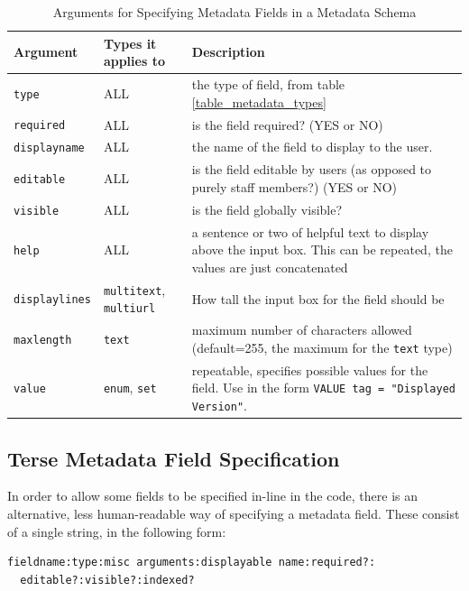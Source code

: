 \begin{table}
\begin{tabularx}{350pt}{|l|l|X|}
\hline
Argument           & Types it applies to   & Description \\
\hline
{\tt type}         & ALL                   & the type of field, from table \ref{table_metadata_types} \\
{\tt required}     & ALL                   & is the field required? (YES or NO) \\
{\tt displayname}  & ALL                   & the name of the field to display to the user. \\
{\tt editable}     & ALL                   & is the field editable by users (as opposed to purely staff members?) (YES or NO) \\
{\tt visible}      & ALL                   & is the field globally visible? \\
{\tt help}         & ALL                   & a sentence or two of helpful text to display above the input box. This can be repeated, the values are just concatenated \\
{\tt displaylines} & {\tt multitext}, {\tt multiurl} & How tall the input box for the field should be \\
{\tt maxlength}    & {\tt text}            & maximum number of characters allowed (default=255, the maximum for the {\tt text} type) \\
{\tt value}        & {\tt enum}, {\tt set} & repeatable, specifies possible values for the field. Use in the form {\tt VALUE tag = "Displayed Version"}. \\
\hline
\end{tabularx}
\caption{\label{metadata_arguments} Arguments for Specifying Metadata Fields in a Metadata Schema}
\end{table}


\subsection{Terse Metadata Field Specification}

In order to allow some fields to be specified in-line in the code, there is an alternative, less human-readable way of specifying a metadata field. These consist of a single string, in the following form:

\begin{verbatim}
fieldname:type:misc arguments:displayable name:required?:
  editable?:visible?:indexed?
\end{verbatim}

